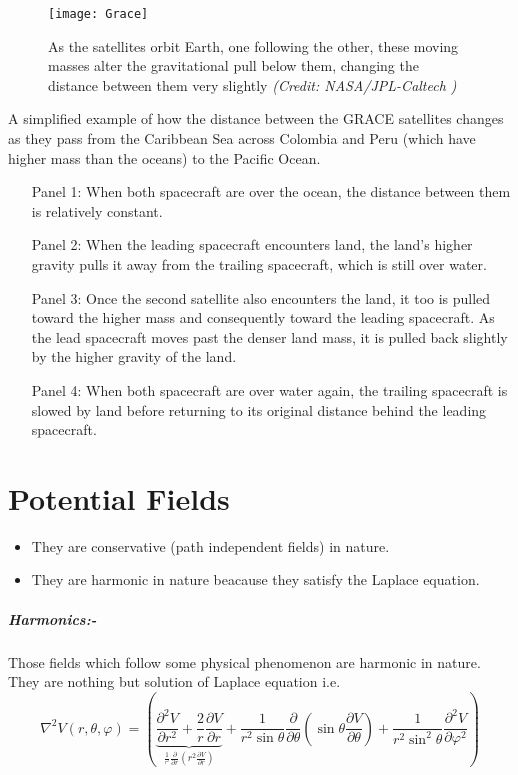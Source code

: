 \documentclass[a4paper,12pt]{report}
\begin{document}
\begin{figure}[!h]
\centering
\texttt{[image: Grace]}
\caption{As the satellites orbit Earth, one following the other, these moving masses alter the gravitational pull below them, changing the distance between them very slightly %
\textit{(Credit: NASA/JPL-Caltech )}%
}
\label{fig:GRACE}
\end{figure}

A simplified example of how the distance between the GRACE satellites changes as they pass from the Caribbean Sea across Colombia and Peru (which have higher mass than the oceans) to the Pacific Ocean.
\begin{itemize}

	\item[Panel 1:] When both spacecraft are over the ocean, the distance between them is relatively constant.

	\item[Panel 2:] When the leading spacecraft encounters land, the land's higher gravity pulls it away from the trailing spacecraft, which is still over water.

	\item[Panel 3:] Once the second satellite also encounters the land, it too is pulled toward the higher mass and consequently toward the leading spacecraft. As the lead spacecraft moves past the denser land mass, it is pulled back slightly by the higher gravity of the land.

	\item[Panel 4:] When both spacecraft are over water again, the trailing spacecraft is slowed by land before returning to its original distance behind the leading spacecraft.

\end{itemize}

\chapter{Potential Fields}
\begin{itemize}
\item They are conservative (path independent fields) in nature.     
\item They are harmonic in nature beacause they satisfy the Laplace equation.
\end{itemize}
\paragraph{Harmonics:-} Those fields which follow some physical phenomenon are harmonic in nature. They are nothing but solution of Laplace equation i.e.
\begin {equation}
\nabla ^2V(r,\theta ,\varphi) = \left( {\underbrace {\frac{\partial ^2V }{\partial r^2} +
\frac{2}{r}\frac{\partial V }{\partial
r}}_{\frac{1}{^{r^2}}\frac{\partial }{\partial r}\left( {r^2\frac{\partial
V }{\partial r}} \right)} + \frac{1}{r^2\sin \theta }\frac{\partial
}{\partial \theta }\left( {\sin \theta \frac{\partial V }{\partial \theta
}} \right) + \frac{1}{r^2\sin ^2\theta }\frac{\partial ^2V }{\partial
\varphi ^2}} \right)
\end{equation}
\end{document}
